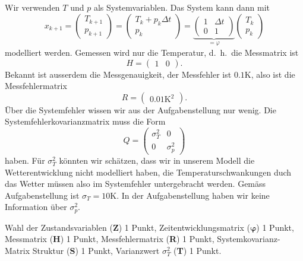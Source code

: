 \begin{loesung}
Wir verwenden $T$ und $p$ als Systemvariablen.
Das System kann dann mit 
\[
x_{k+1}
=
\begin{pmatrix}
T_{k+1}\\p_{k+1}
\end{pmatrix}
=
\begin{pmatrix}
T_k + p_k\Delta t\\
p_k
\end{pmatrix}
=
\underbrace{
\begin{pmatrix}
1&\Delta t\\
0&1
\end{pmatrix}
}_{\displaystyle=\varphi}
\begin{pmatrix}T_k\\p_k\end{pmatrix}
\]
modelliert werden.
Gemessen wird nur die Temperatur, d.~h.~die Messmatrix ist
\[
H=\begin{pmatrix}1&0\end{pmatrix}.
\]
Bekannt ist ausserdem die Messgenauigkeit, der Messfehler ist $0.1\text{K}$,
also ist die Messfehlermatrix
\[
R=\begin{pmatrix}0.01\text{K}^2\end{pmatrix}.
\]
Über die Systemfehler wissen wir aus der Aufgabenstellung nur wenig.
Die Systemfehlerkovarianzmatrix muss die Form
\[
Q=\begin{pmatrix}
\sigma_T^2&0\\
0&\sigma_p^2
\end{pmatrix}
\]
haben.
Für $\sigma_T^2$ könnten wir schätzen, dass wir in unserem Modell die
Wetterentwicklung nicht modelliert haben, die Temperaturschwankungen
duch das Wetter müssen also im Systemfehler untergebracht werden.
Gemäss Aufgabenstellung ist $\sigma_T=10\text{K}$.
In der Aufgabenstellung haben wir keine Information über $\sigma_p^2$.
\end{loesung}

\begin{bewertung}
Wahl der Zustandsvariablen ({\bf Z}) 1 Punkt,
Zeitentwicklungsmatrix ($\bm{\varphi}$) 1 Punkt,
Messmatrix ({\bf H}) 1 Punkt,
Messfehlermatrix ({\bf R}) 1 Punkt,
Systemkovarianz-Matrix Struktur ({\bf S}) 1 Punkt,
Varianzwert $\sigma_T^2$ ({\bf T}) 1 Punkt.
\end{bewertung}

